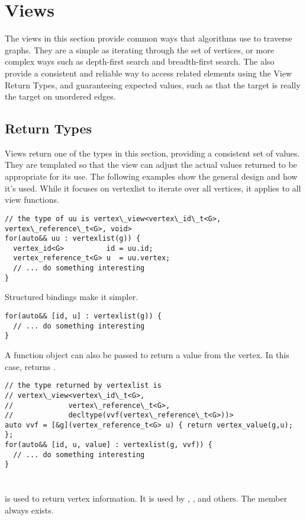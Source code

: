 \chapter{Views}

The views in this section provide common ways that algorithms use to traverse graphs. They are a simple as iterating through the set of vertices, or more complex ways such as depth-first search and breadth-first search. The also provide a consistent and reliable way to access related elements using the View Return Types, and guaranteeing expected values, such as that the target is really the target on unordered edges.

\section{Return Types}
Views return one of the types in this section, providing a consistent set of values. They are templated so that the view can adjust the actual values returned to be appropriate for its use. The following examples show the general design and how it's used. While it focuses on vertexlist to iterate over all vertices, it applies to all view functions.

\begin{lstlisting}
// the type of uu is vertex\_view<vertex\_id\_t<G>, vertex\_reference\_t<G>, void>
for(auto&& uu : vertexlist(g)) {
  vertex_id<G>          id = uu.id;
  vertex_reference_t<G> u  = uu.vertex;
  // ... do something interesting
}
\end{lstlisting}

Structured bindings make it simpler.
\begin{lstlisting}
for(auto&& [id, u] : vertexlist(g)) {
  // ... do something interesting
}
\end{lstlisting}

A function object can also be passed to return a value from the vertex. In this case,  returns .
\begin{lstlisting}
// the type returned by vertexlist is 
// vertex\_view<vertex\_id\_t<G>, 
//             vertex\_reference\_t<G>, 
//             decltype(vvf(vertex\_reference\_t<G>))>
auto vvf = [&g](vertex_reference_t<G> u) { return vertex_value(g,u); };
for(auto&& [id, u, value] : vertexlist(g, vvf)) {
  // ... do something interesting
}
\end{lstlisting}

\subsubsection{}\label{vertex-view}\mbox{} \\
 is used to return vertex information. It is used by , ,  and others. The  member always exists.

